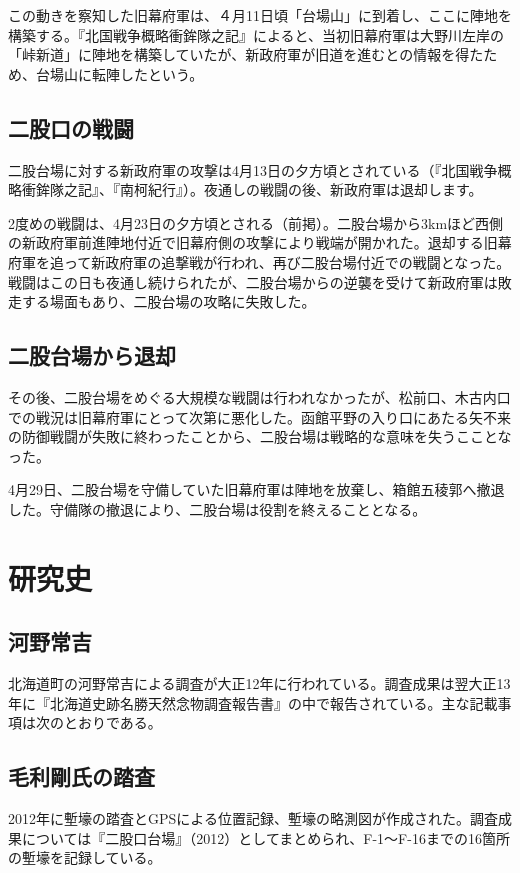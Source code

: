 \documentclass[14Q]{jsarticle}
\begin{document}
この動きを察知した旧幕府軍は、４月11日頃「台場山」に到着し、ここに陣地を構築する。『北国戦争概略衝鉾隊之記』によると、当初旧幕府軍は大野川左岸の「峠新道」に陣地を構築していたが、新政府軍が旧道を進むとの情報を得たため、台場山に転陣したという。

\subsection{二股口の戦闘}
二股台場に対する新政府軍の攻撃は4月13日の夕方頃とされている（『北国戦争概略衝鉾隊之記』、『南柯紀行』）。夜通しの戦闘の後、新政府軍は退却します。

2度めの戦闘は、4月23日の夕方頃とされる（前掲）。二股台場から3kmほど西側の新政府軍前進陣地付近で旧幕府側の攻撃により戦端が開かれた。退却する旧幕府軍を追って新政府軍の追撃戦が行われ、再び二股台場付近での戦闘となった。戦闘はこの日も夜通し続けられたが、二股台場からの逆襲を受けて新政府軍は敗走する場面もあり、二股台場の攻略に失敗した。

\subsection{二股台場から退却}
その後、二股台場をめぐる大規模な戦闘は行われなかったが、松前口、木古内口での戦況は旧幕府軍にとって次第に悪化した。函館平野の入り口にあたる矢不来の防御戦闘が失敗に終わったことから、二股台場は戦略的な意味を失うこことなった。

4月29日、二股台場を守備していた旧幕府軍は陣地を放棄し、箱館五稜郭へ撤退した。守備隊の撤退により、二股台場は役割を終えることとなる。

\section{研究史}
\subsection{河野常吉}
北海道町の河野常吉による調査が大正12年に行われている。調査成果は翌大正13年に『北海道史跡名勝天然念物調査報告書』の中で報告されている。主な記載事項は次のとおりである。

\subsection{毛利剛氏の踏査}
2012年に塹壕の踏査とGPSによる位置記録、塹壕の略測図が作成された。調査成果については『二股口台場』（2012）としてまとめられ、F-1〜F-16までの16箇所の塹壕を記録している。
\end{document}
